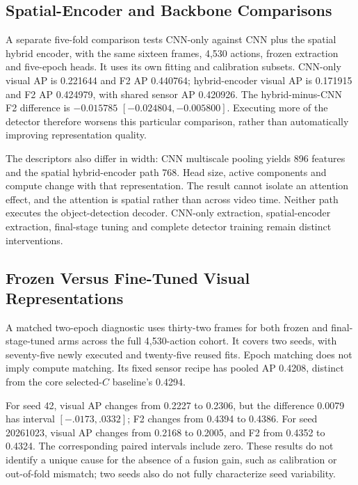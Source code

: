 \subsection{Spatial-Encoder and Backbone Comparisons}
A separate five-fold comparison tests CNN-only against CNN plus the spatial hybrid
encoder, with the same sixteen frames, 4,530 actions, frozen extraction and five-epoch
heads. It uses its own fitting and calibration subsets. CNN-only visual AP is 0.221644
and F2 AP 0.440764; hybrid-encoder visual AP is 0.171915 and F2 AP 0.424979, with shared
sensor AP 0.420926. The hybrid-minus-CNN F2 difference is $-0.015785$
$[-0.024804,-0.005800]$. Executing more of the detector therefore worsens this
particular comparison, rather than automatically improving representation
quality.

The descriptors also differ in width: CNN multiscale pooling yields 896 features and the
spatial hybrid-encoder path 768. Head size, active components and compute change with
that representation. The result cannot isolate an attention effect, and the attention is
spatial rather than across video time. Neither path executes the object-detection
decoder. CNN-only extraction, spatial-encoder extraction, final-stage tuning and
complete detector training remain distinct interventions.

\subsection{Frozen Versus Fine-Tuned Visual Representations}
A matched two-epoch diagnostic uses thirty-two frames for both frozen and
final-stage-tuned arms across the full 4,530-action cohort. It covers two seeds, with
seventy-five newly executed and twenty-five reused fits. Epoch matching does not imply
compute matching. Its fixed sensor recipe has pooled AP 0.4208, distinct from the core
selected-$C$ baseline's 0.4294.

For seed 42, visual AP changes from 0.2227 to 0.2306, but the difference 0.0079 has
interval $[-.0173,.0332]$; F2 changes from 0.4394 to 0.4386. For seed 20261023, visual
AP changes from 0.2168 to 0.2005, and F2 from 0.4352 to 0.4324. The corresponding paired
intervals include zero. These results do not identify a unique cause for the absence of
a fusion gain, such as calibration or out-of-fold mismatch; two seeds also do not fully
characterize seed variability.


